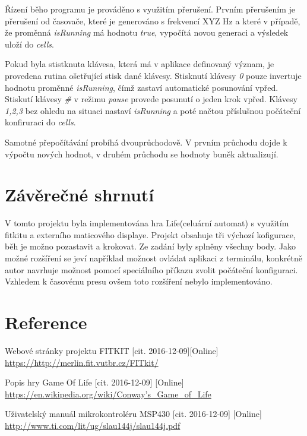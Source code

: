 \documentclass[12pt,a4paper,titlepage]{article}
\begin{document}
Řízení běho programu je prováděno s využitím přerušení. Prvním přerušením je přerušení od časovače, které je generováno s frekvencí XYZ Hz a které v případě, že proměnná \textit{isRunning} má hodnotu \textit{true}, vypočítá novou generaci a výsledek uloží do \textit{cells}.


Pokud byla stistknuta klávesa, která má v aplikace definovaný význam, je provedena rutina ošetřující stisk dané klávesy.
Stisknutí klávesy \textit{0} pouze invertuje hodnotu proměnné \textit{isRunning}, čímž zastaví automatické posunování vpřed. Stiskutí klávesy \textit{\#} v režimu \textit{pause} provede posunutí o jeden krok vpřed. Klávesy \textit{1,2,3} bez ohledu na situaci nastaví \textit{isRunning} a poté načtou příslušnou počáteční konfiruraci do \textit{cells}.

Samotné přepočítávání probíhá dvouprůchodově. V prvním průchodu dojde k výpočtu nových hodnot, v druhém průchodu se hodnoty buněk aktualizují.

\section{Závěrečné shrnutí}
V tomto projektu byla implementována hra Life(celuární automat) s využitím fitkitu a externího maticového displaye. Projekt obsahuje tři výchozí kofigurace, běh je možno pozastavit a krokovat. Ze zadání byly splněny všechny body. Jako možné rozšíření se jeví například možnost ovládat aplikaci z terminálu, konkrétně autor navrhuje možnost pomocí speciálního příkazu zvolit počáteční konfiguraci. Vzhledem k časovému presu ovšem toto rozšíření nebylo implementováno.

\section*{Reference}
\begin{enumerate}[label={[\arabic*]}]
\item Webové stránky projektu FITKIT [cit. 2016-12-09][Online] \\
     \href{https://http://merlin.fit.vutbr.cz/FITkit/}
          {https://http://merlin.fit.vutbr.cz/FITkit/}
     \label{fitkit}
\item Popis hry Game Of Life [cit. 2016-12-09] [Online] \\
    \href{https://en.wikipedia.org/wiki/Conway's\_Game\_of\_Life}
         {https://en.wikipedia.org/wiki/Conway's\_Game\_of\_Life}
    \label{game-of-life}
\item Uživatelský manuál mikrokontroléru MSP430 [cit. 2016-12-09] [Online] \\
    \href{http://www.ti.com/lit/ug/slau144j/slau144j.pdf}
         {http://www.ti.com/lit/ug/slau144j/slau144j.pdf}
    \label{msp430}
\end{enumerate}
\end{document}
